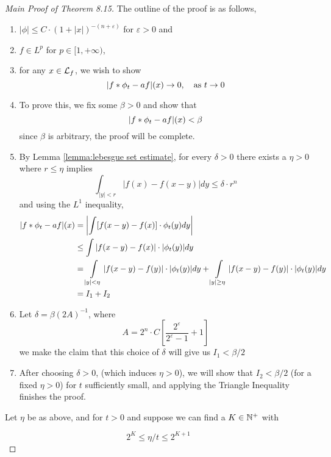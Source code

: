 \documentclass[../../main.tex]{subfiles}
\begin{document}
\begin{proof}[Main Proof of Theorem 8.15]
    The outline of the proof is as follows,
    \begin{enumerate}
        \item $|\phi|\leq C\cdot (1+|x|)^{-(n+\varepsilon)}$ for $\varepsilon>0$ and
        \item $f\in L^p$ for $p\in[1,+\infty)$,
        
        \item for any $x\in\mathcal{L}_f$, we wish to show \[|f\ast\phi_t - af|(x)\to 0,\quad\text{as }t \to 0\]
        
        \item To prove this, we fix some $\beta>0$ and show that\[|f\ast\phi_t - af|(x)<\beta\]
        since $\beta$ is arbitrary, the proof will be complete.

        \item By Lemma \ref{lemma:lebesgue set estimate}, for every $\delta>0$ there exists a $\eta>0$ where $r\leq \eta$ implies
        \[\int_{|y|<r}|f(x)-f(x-y)|dy\leq\delta\cdot r^n\] and using the $L^1$ inequality,
        \begin{align*}|f\ast\phi_t-af|(x)&=\left|\int [f(x-y)-f(x)]\cdot\phi_t(y)dy\right|\\
        &\leq\int |f(x-y)-f(x)|\cdot|\phi_t(y)|dy\\
        &=\int\limits_{|y|<\eta} |f(x-y)-f(y)|\cdot|\phi_t(y)|dy + \int\limits_{|y|\geq\eta} |f(x-y)-f(y)|\cdot|\phi_t(y)|dy\\
        &=I_1 +I_2
        \end{align*}
        
        \item Let $\delta = \beta(2A)^{-1}$, where 
        \[A = 2^n\cdot C\left[\dfrac{2^\varepsilon}{2^\varepsilon-1}+1\right]\]
        we make the claim that this choice of $\delta$ will give us $I_1<\beta/2$
        
        \item After choosing $\delta>0$, (which induces $\eta>0$), we will show that $I_2<\beta/2$ (for a fixed $\eta>0$) for $t$ sufficiently small, and applying the Triangle Inequality finishes the proof.
    \end{enumerate}
    Let $\eta$ be as above, and for $t>0$ and suppose we can find a $K\in\mathbb{N}^+$ with

    \begin{equation}\label{alpha estimate}
    2^K\leq \eta/t\leq 2^{K+1}
    \end{equation}


\end{proof}
\end{document}
